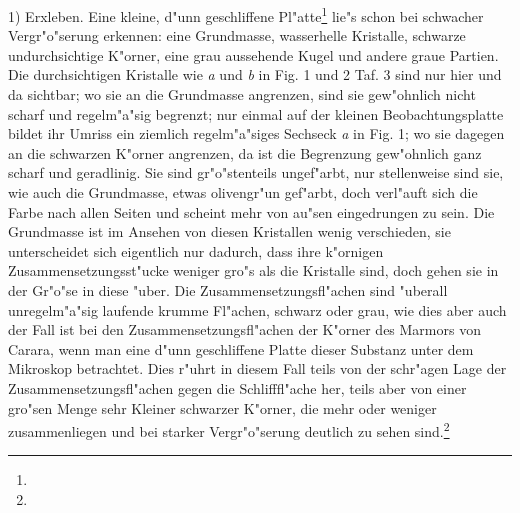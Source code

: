 \documentclass[a4paper, 11pt, oneside]{article}
\begin{document}
1) Erxleben. Eine kleine, d"unn geschliffene Pl"atte\footnote{} lie"s schon bei schwacher Vergr"o"serung erkennen: eine Grundmasse, wasserhelle Kristalle, schwarze undurchsichtige K"orner, eine grau aussehende Kugel und andere graue Partien. Die durchsichtigen Kristalle wie \emph{a} und \emph{b} in Fig. 1 und 2 Taf. 3 sind nur hier und da sichtbar; wo sie an die Grundmasse angrenzen, sind sie gew"ohnlich nicht scharf und regelm"a"sig begrenzt; nur einmal auf der kleinen Beobachtungsplatte bildet ihr Umriss ein ziemlich regelm"a"siges Sechseck \emph{a} in Fig. 1; wo sie dagegen an die schwarzen K"orner angrenzen, da ist die Begrenzung gew"ohnlich ganz scharf und geradlinig. Sie sind gr"o"stenteils ungef"arbt, nur stellenweise sind sie, wie auch die Grundmasse, etwas olivengr"un gef"arbt, doch verl"auft sich die Farbe nach allen Seiten und scheint mehr von au"sen eingedrungen zu sein. Die Grundmasse ist im Ansehen von diesen Kristallen wenig verschieden, sie unterscheidet sich eigentlich nur dadurch, dass ihre k"ornigen Zusammensetzungsst"ucke weniger gro"s als die Kristalle sind, doch gehen sie in der Gr"o"se in diese "uber. Die Zusammensetzungsfl"achen sind "uberall unregelm"a"sig laufende krumme Fl"achen, schwarz oder grau, wie dies aber auch der Fall ist bei den Zusammensetzungsfl"achen der K"orner des Marmors von Carara, wenn man eine d"unn geschliffene Platte dieser Substanz unter dem Mikroskop betrachtet. Dies r"uhrt in diesem Fall teils von der schr"agen Lage der Zusammensetzungsfl"achen gegen die Schlifffl"ache her, teils aber von einer gro"sen Menge sehr Kleiner schwarzer K"orner, die mehr oder weniger zusammenliegen und bei starker Vergr"o"serung deutlich zu sehen sind.\footnote{}
\end{document}
